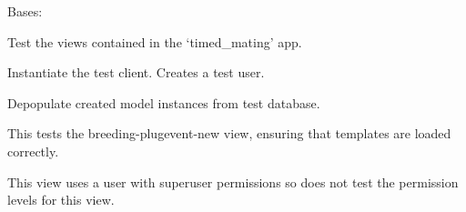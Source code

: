 \documentclass[letterpaper,10pt,english]{sphinxmanual}
\begin{document}
\begin{fulllineitems}
\label{api:mousedb.timed_mating.tests.Timed_MatingViewTests}
Bases: 

Test the views contained in the `timed\_mating' app.

\begin{fulllineitems}
\label{api:mousedb.timed_mating.tests.Timed_MatingViewTests.fixtures}
\end{fulllineitems}


\begin{fulllineitems}
\label{api:mousedb.timed_mating.tests.Timed_MatingViewTests.setUp}
Instantiate the test client.  Creates a test user.

\end{fulllineitems}


\begin{fulllineitems}
\label{api:mousedb.timed_mating.tests.Timed_MatingViewTests.tearDown}
Depopulate created model instances from test database.

\end{fulllineitems}


\begin{fulllineitems}
\label{api:mousedb.timed_mating.tests.Timed_MatingViewTests.test_breeding_plugevent_new}
This tests the breeding-plugevent-new view, ensuring that templates are loaded correctly.

This view uses a user with superuser permissions so does not test the permission levels for this view.

\end{fulllineitems}


\end{fulllineitems}
\end{document}
